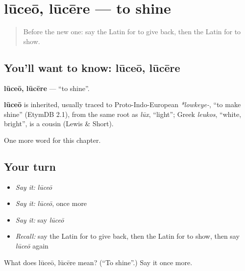 \section[lūceō, lūcēre]{lūceō, lūcēre — to shine}

\label{lesson:LA-C157-luceo}



\begin{quote}
Before the new one: say the Latin for to give back, then the Latin for to show.
\end{quote}

\subsection*{You'll want to know: lūceō, lūcēre}
\textbf{lūceō, lūcēre} — \textquotedblleft{}to shine\textquotedblright{}.

\begin{cousinweb}
\textbf{lūceō} is inherited, usually traced to Proto-Indo-European \emph{*lowkeye-}, \textquotedblleft{}to make shine\textquotedblright{} (EtymDB 2.1), from the same root as \emph{lūx}, \textquotedblleft{}light\textquotedblright{}; Greek \emph{leukos}, \textquotedblleft{}white, bright\textquotedblright{}, is a cousin (Lewis \& Short).
\end{cousinweb}

\begin{grammarlens}[title={What you've built}]
One more word for this chapter.
\end{grammarlens}

\subsection*{Your turn}
\begin{itemize}
\raggedright
  \item \emph{Say it:} \emph{lūceō}
  \item \emph{Say it:} \emph{lūceō}, once more
  \item \emph{Say it:} say \emph{lūceō}
  \item \emph{Recall:} say the Latin for to give back, then the Latin for to show, then say \emph{lūceō} again
\end{itemize}

\begin{tcolorbox}[breakable,colback=teal!4,colframe=teal!35!black,title={Before you move on}]
What does lūceō, lūcēre mean? (\textquotedblleft{}To shine\textquotedblright{}.) Say it once more.
\end{tcolorbox}
